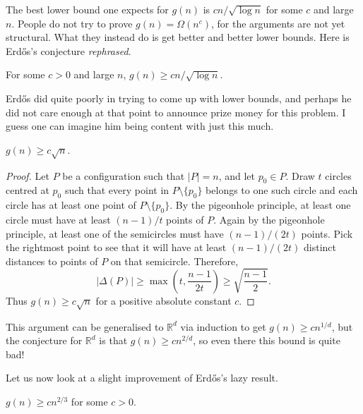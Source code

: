 \documentclass[11pt,a4paper]{article}
\begin{document}
The best lower bound one expects for $g(n)$ is $cn/\sqrt{\log n}$ for
some $c$ and large $n$. People do not try to prove $g(n)=\Omega(n^c)$,
for the arguments are not yet structural. What they instead do is get
better and better lower bounds. Here is Erd\H{o}s's conjecture \emph{rephrased}.
\setcounter{theorem}{3}\begin{conjecture}
For some $c>0$ and large $n$, $g(n)\ge cn/\sqrt{\log n}$.
\end{conjecture}
Erd\H{o}s did quite poorly in trying to come up with lower bounds, and
perhaps he did not care enough at that point to announce prize money for
this problem. I guess one can imagine him being content with just this much.
\setcounter{theorem}{4}\begin{theorem}[Erd\H{o}s, 1946]
$g(n)\ge c\sqrt n$.
\end{theorem}
\begin{proof}
Let $P$ be a configuration such that $|P|=n$, and let $p_0\in P$.
Draw $t$ circles centred at $p_0$ such that every point in $P\setminus\{p_0\}$ belongs to
one such circle and each circle has at least one point of $P\setminus\{p_0\}$.
By the pigeonhole principle, at least one circle must have at least $(n-1)/t$
points of $P$. Again by the pigeonhole principle, at least one of the
semicircles must have $(n-1)/(2t)$ points. Pick the rightmost point to see that
it will have at least $(n-1)/(2t)$ distinct distances to points of $P$ on that
semicircle. Therefore,
\[
 |\Delta(P)|\ge\max\left(t,\frac {n-1}{2t}\right)
 \ge\sqrt{\frac {n-1}2}.
\]
Thus $g(n)\geq c\sqrt n$ for a positive absolute constant $c$.
\end{proof}
\begin{remark}
This argument can be generalised to $\mathbb R^d$ via induction to get
$g(n)\ge cn^{1/d}$, but the conjecture for $\mathbb R^d$ is that
$g(n)\ge cn^{2/d}$, so even there this bound is quite bad!
\end{remark}
Let us now look at a slight improvement of Erd\H{o}s's lazy result.
\setcounter{theorem}{5}\begin{theorem}[Moser, 1952]
$g(n)\ge cn^{2/3}$ for some $c>0$.
\end{theorem}
\end{document}

